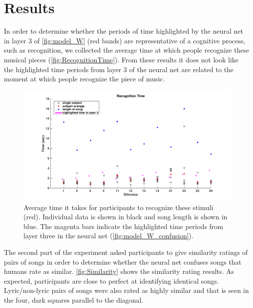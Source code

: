 \section{Results}
In order to determine whether the periods of time highlighted by the neural net in layer 3 of \autoref{fig:model_W} (red bands) are representative of a cognitive process, such as recognition, we collected the average time at which people recognize these musical pieces (\autoref{fig:RecognitionTime}). 
From these results it does not look like the highlighted time periods from layer 3 of the neural net are related to the moment at which people recognize the piece of music. 
\begin{figure}[h] 
  \begin{center}
        \includegraphics[scale=0.5]{Figures/RecognitionTimeGraph.png}
    \caption{Average time it takes for participants to recognize these stimuli (red). Individual data is shown in black and song length is shown in blue. The magenta bars indicate the highlighted time periods from layer three in the neural net (\autoref{fig:model_W_confusion}).}
    \label{fig:RecognitionTime}
  \end{center}
\end{figure}
The second part of the experiment asked participants to give similarity ratings of pairs of songs in order to determine whether the neural net confuses songs that humans rate as similar. 
\autoref{fig:Similarity} shows the similarity rating results. 
As expected, participants are close to perfect at identifying identical songs. 
Lyric/non-lyric pairs of songs were also rated as highly similar and that is seen in the four, dark squares parallel to the diagonal.

